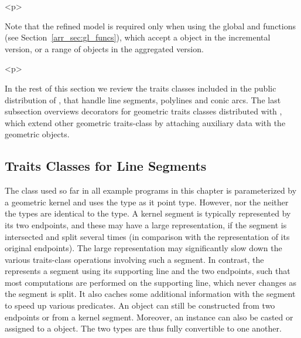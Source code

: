\begin{ccHtmlOnly}<p>\end{ccHtmlOnly}
Note that the refined model  is required
only when using the global  and
 functions (see Section~\ref{arr_sec:gl_funcs}),
which accept a  object in the incremental version,
or a range of  objects in the aggregated version.

\begin{ccHtmlOnly}<p>\end{ccHtmlOnly}
In the rest of this section we review the traits classes
included in the public distribution of \cgal, that handle line
segments, polylines and conic arcs. The last subsection overviews
decorators for geometric traits classes distributed with \cgal,
which extend other geometric traits-class by attaching auxiliary
data with the geometric objects.

\subsection{Traits Classes for Line Segments}
\label{arr_ssec:tr_segs}
%
The  class used so far
in all example programs in this chapter is parameterized by a
geometric kernel and uses the  type as it
point type. However, nor the  neither the
 types are identical to the
 type. A kernel segment is typically
represented by its two endpoints, and these may have a large
representation, if the segment is intersected and split several
times (in comparison with the representation of its original
endpoints). The large representation may significantly slow down the
various traits-class operations involving such a segment. In contrast,
the  represents a segment using
its supporting line and the two endpoints, such that most computations
are performed on the supporting line, which never changes as the
segment is split. It also caches some additional information with
the segment to speed up various predicates.
An  object can still be constructed from two
endpoints or from a kernel segment. Moreover, an
 instance can also be casted or assigned to a
 object. The two types are thus fully
convertible to one another.

